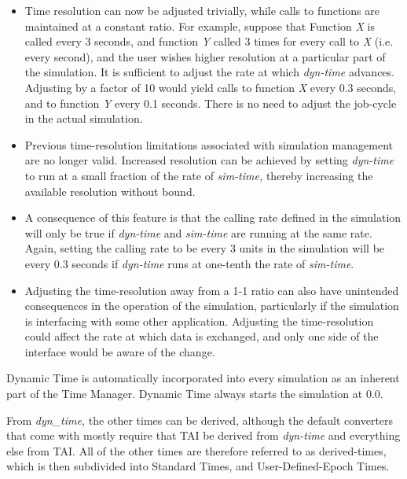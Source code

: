 \begin{itemize}
\item Time resolution can now be adjusted trivially, while calls to
functions are maintained at a constant ratio.  For example, suppose
that Function \textit{X} is called every 3 seconds, and function
\textit{Y} called 3 times for every call to \textit{X }(i.e. every
second), and the user wishes higher resolution at a particular part of
the simulation.  It is sufficient to adjust the rate at which
\textit{dyn-time }advances. Adjusting by a factor of 10 would yield
calls to function \textit{X} every 0.3 seconds, and to function
\textit{Y} every 0.1 seconds.  There is no need to adjust the job-cycle
in the actual simulation.
\item Previous time-resolution limitations associated with simulation
management are no longer valid.  Increased resolution can be achieved
by setting \textit{dyn-time} to run at a small fraction of the rate of
\textit{sim-time, }thereby increasing the available resolution without
bound.
\item A consequence of this feature is that the calling rate defined in
the simulation will only be true if \textit{dyn-time} and
\textit{sim-time} are running at the same rate.  Again, setting the
calling rate to be every 3 units in the simulation will be every 0.3
seconds if \textit{dyn-time} runs at one-tenth the rate of
\textit{sim-time}.
\item Adjusting the time-resolution away from a 1-1 ratio can also have
unintended consequences in the operation of the simulation,
particularly if the simulation is interfacing with some other
application.  Adjusting the time-resolution could affect the rate at
which data is exchanged, and only one side of the interface would be
aware of the change.



\end{itemize}



Dynamic Time is automatically incorporated into every simulation as an
inherent part of the Time Manager.  Dynamic Time always starts the
simulation at 0.0.




From\textit{ dyn\_time, }the other times can be derived, although the
default converters that come with \JEODid mostly require that TAI be
derived from \textit{dyn-time} and everything else from TAI.  All of
the other times are therefore referred to as derived-times, which is
then subdivided into Standard Times, and User-Defined-Epoch Times.




